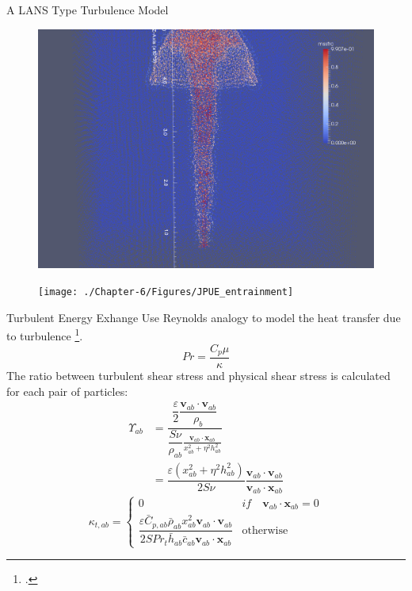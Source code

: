 \documentclass{beamer}
\begin{document}
\begin{frame}{A LANS Type Turbulence Model}
\begin{minipage}{0.34 \textwidth}
\begin{figure}
\includegraphics[width=0.80 \textwidth]{./PPT/No_turb}
\end{figure}
%
\begin{figure}
\texttt{[image: ./Chapter-6/Figures/JPUE\_entrainment]}
\end{figure}
\end{minipage}
\end{frame}

\begin{frame}{Turbulent Energy Exhange}
Use Reynolds analogy to model the heat transfer due to turbulence \footcite{gmd-2017-119}.
\begin{equation}
Pr=\dfrac{C_p \mu}{\kappa}
\end{equation}
The ratio between turbulent shear stress and physical shear stress is calculated for each pair of particles:
\begin{equation}
\begin{split}
\Upsilon_{ab} &= \dfrac{\dfrac{\varepsilon}{2} \dfrac{\textbf{v}_{ab} \cdot \textbf{v}_{ab}}{\rho_b}}{\dfrac{S \nu}{\rho_{ab}} \frac{\textbf{v}_{ab} \cdot \textbf{x}_{ab}}{x_{ab}^2 + \eta^2 h_{ab}^2}} \\
 & = \dfrac{\varepsilon \left(x_{ab}^2 + \eta^2 h_{ab}^2\right)}{2 S \nu} \dfrac{\textbf{v}_{ab} \cdot \textbf{v}_{ab}}{\textbf{v}_{ab} \cdot \textbf{x}_{ab}}
\end{split}
\end{equation}
\begin{equation}
\kappa_{t,ab}= 
\begin{cases} 
      0 & if \quad \textbf{v}_{ab} \cdot \textbf{x}_{ab} = 0 \\
      \dfrac{\varepsilon \bar{C}_{p,ab} \bar{\rho}_{ab} x_{ab}^2 \textbf{v}_{ab} \cdot \textbf{v}_{ab}}{2 S Pr_t \bar{h}_{ab} \bar{c}_{ab} \textbf{v}_{ab} \cdot \textbf{x}_{ab} } & \text{otherwise}
\end{cases}
\label{eq:SPH-LANS-heat-conductivity}
\end{equation}
\end{frame}
\end{document}

